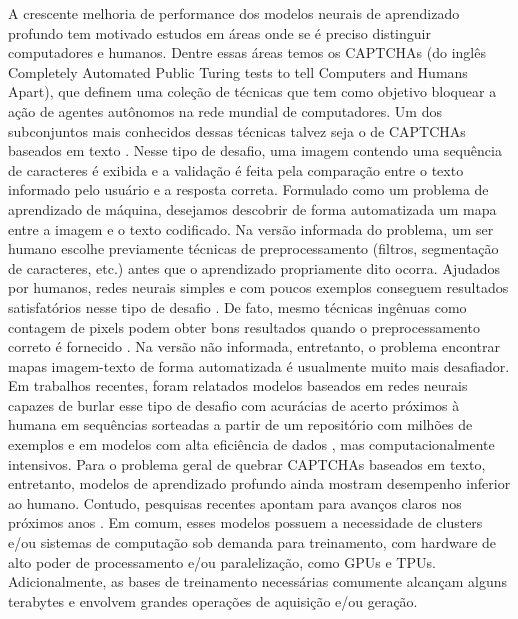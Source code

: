 A crescente melhoria de performance dos modelos neurais de aprendizado profundo tem motivado estudos em áreas onde se é preciso distinguir computadores e humanos. Dentre essas áreas temos os CAPTCHAs \cite{captcha2003} (do inglês Completely Automated  Public  Turing  tests  to  tell  Computers  and Humans Apart), que definem uma coleção de técnicas que tem como objetivo bloquear a ação de agentes autônomos na rede mundial de computadores. Um dos subconjuntos mais conhecidos dessas técnicas talvez seja o de CAPTCHAs baseados em texto \cite{captcha_review_2017}. Nesse tipo de desafio, uma imagem contendo uma sequência de caracteres é exibida e a validação é feita pela comparação entre o texto informado pelo usuário e a resposta correta. Formulado como um problema de aprendizado de máquina, desejamos descobrir de forma automatizada um mapa entre a imagem e o texto codificado. Na versão informada do problema, um ser humano escolhe previamente técnicas de preprocessamento (filtros, segmentação de caracteres, etc.) antes que o aprendizado propriamente dito ocorra. Ajudados por humanos, redes neurais simples e com poucos exemplos conseguem resultados satisfatórios nesse tipo de desafio \cite{lectures2005HIP}. De fato, mesmo técnicas ingênuas como contagem de pixels podem obter bons resultados quando o preprocessamento correto é fornecido \cite{naivecaptcha}. Na versão não informada, entretanto, o problema encontrar mapas imagem-texto de forma automatizada é usualmente muito mais desafiador. Em trabalhos recentes, foram relatados modelos baseados em redes neurais capazes de burlar esse tipo de desafio com acurácias de acerto próximos à humana em sequências sorteadas a partir de um repositório com milhões de exemplos \cite{captcha_break_2013} e em modelos com alta eficiência de dados \cite{captcha_break_2017}, mas computacionalmente intensivos. Para o problema geral de quebrar CAPTCHAs baseados em texto, entretanto, modelos de aprendizado profundo ainda mostram desempenho inferior ao humano. Contudo, pesquisas recentes apontam para avanços claros nos próximos anos \cite{Bursztein2014TheEI}. Em comum, esses modelos possuem a necessidade de clusters e/ou sistemas de computação sob demanda para treinamento, com hardware de alto poder de processamento e/ou paralelização, como GPUs e TPUs. Adicionalmente, as bases de treinamento necessárias comumente alcançam alguns terabytes e envolvem grandes operações de aquisição e/ou geração.

